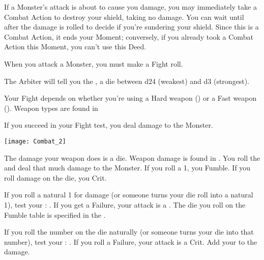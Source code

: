 {  

  If a Monster's attack is about to cause you  damage, you may immediately take a Combat Action to destroy your shield, taking no damage. You can wait until after the damage is rolled to decide if you're sundering your shield.  Since this is a Combat Action, it ends your Moment; conversely, if you already took a Combat Action this Moment, you can't use this Deed.






  When you attack a Monster, you must make a Fight roll.


  The Arbiter will tell you the , a \STATIC die between d24 (weakest) and d3 (strongest).

  Your Fight \RO depends on whether you're using a Hard weapon (\VIG) or a Fast weapon (\DEX).  Weapon types are found in 

  If you succeed in your Fight \RO test, you deal damage to the Monster.

    \begin{center}
  \texttt{[image: Combat\_2]}
  \end{center}


  The damage your weapon does is a \STATIC die.  Weapon damage is found in .  You roll the \STATIC and deal that much damage to the Monster.  If you roll a 1, you Fumble.  If you roll \MAX damage on the die, you Crit.


  If you roll a natural 1 for damage (or someone turns your die roll into a natural 1), test your  \RS : \FOC.  If you get a Failure, your attack is a .  The die you roll on the Fumble table is specified in the .

  If you roll the \MAX number on the die naturally (or someone turns your die into that \MAX number), test your \RS : \FOC.  If you  roll a Failure, your attack is a Crit.  Add your \LVL to the damage.

}
